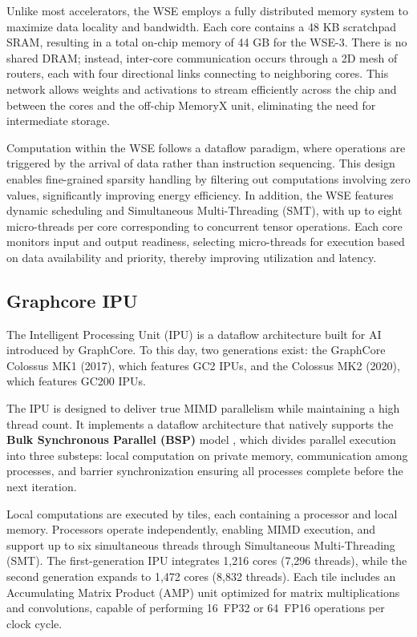 Unlike most accelerators, the WSE employs a fully distributed memory system to maximize data locality and bandwidth. Each core contains a 48 KB scratchpad SRAM, resulting in a total on-chip memory of 44 GB for the WSE-3. There is no shared DRAM; instead, inter-core communication occurs through a 2D mesh of routers, each with four directional links connecting to neighboring cores. This network allows weights and activations to stream efficiently across the chip and between the cores and the off-chip MemoryX unit, eliminating the need for intermediate storage.

Computation within the WSE follows a dataflow paradigm, where operations are triggered by the arrival of data rather than instruction sequencing. This design enables fine-grained sparsity handling by filtering out computations involving zero values, significantly improving energy efficiency. In addition, the WSE features dynamic scheduling and Simultaneous Multi-Threading (SMT), with up to eight micro-threads per core corresponding to concurrent tensor operations. Each core monitors input and output readiness, selecting micro-threads for execution based on data availability and priority, thereby improving utilization and latency.

\subsection{Graphcore IPU}

The Intelligent Processing Unit (IPU) is a dataflow architecture built for AI introduced by GraphCore.
To this day, two generations exist: the GraphCore Colossus MK1 (2017), which features GC2 IPUs, and the Colossus MK2 (2020), which features GC200 IPUs.

The IPU is designed to deliver true MIMD parallelism while maintaining a high thread count. It implements a dataflow architecture that natively supports the \textbf{Bulk Synchronous Parallel (BSP)} model \cite{Jia2019}, which divides parallel execution into three substeps: local computation on private memory, communication among processes, and barrier synchronization ensuring all processes complete before the next iteration.

Local computations are executed by tiles, each containing a processor and local memory. Processors operate independently, enabling MIMD execution, and support up to six simultaneous threads through Simultaneous Multi-Threading (SMT). The first-generation IPU integrates 1,216 cores (7,296 threads), while the second generation expands to 1,472 cores (8,832 threads). Each tile includes an Accumulating Matrix Product (AMP) unit optimized for matrix multiplications and convolutions, capable of performing 16~FP32 or 64~FP16 operations per clock cycle.

